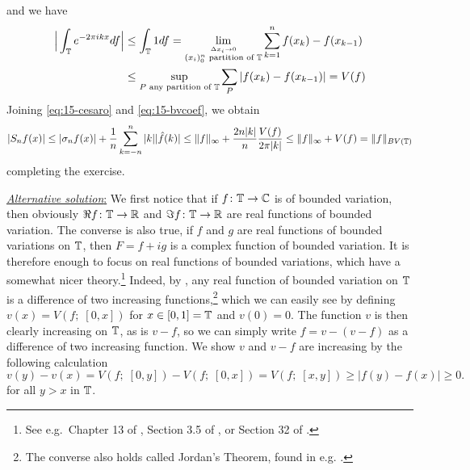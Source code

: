 \documentclass[a4paper, 12pt]{article}
\begin{document}
\begin{Exercise}
    and we have
    \begin{align*}
        \Big| \int_{\mathbb{T}} e^{-2\pi i k x} df \Big|
        &\leq \int_{\mathbb{T}} 1 df
        = \lim_{\overset{\Delta x_i \to 0}{(x_i)_0^n \text{ partition of } \mathbb{T}}} \sum_{k = 1}^{n} f(x_k) - f(x_{k-1}) \\
        &\leq \sup_{P \text{ any partition of } \mathbb{T}} \sum_{P} |f(x_k) - f(x_{k-1})|
        = V(f)
    \end{align*}
    Joining \eqref{eq:15-cesaro} and \eqref{eq:15-bvcoef}, we obtain
    \[
        |S_n f(x) |
        \leq |\sigma_n f(x)| + \frac{1}{n}\sum_{k = -n}^{n} |k| |\hat{f}(k)|
        \leq \| f\|_\infty + \frac{2n|k|}{n} \frac{V(f)}{2\pi |k|}
        \leq \| f\|_\infty + V(f)
        = \| f \|_{BV(\mathbb{T})}
    \]
    completing the exercise.

    \underline{\emph{Alternative solution}:}
    We first notice that if $f \colon \mathbb{T} \to \mathbb{C}$ is of bounded variation, then
    obviously $\Re f \colon \mathbb{T} \to \mathbb{R}$ and $\Im f \colon \mathbb{T} \to \mathbb{R}$ are real
    functions of bounded variation.  The converse is also true, if $f$ and $g$
    are real functions of bounded variations on $\mathbb{T}$, then $F = f + ig$ is a
    complex function of bounded variation. It is therefore enough to focus on
    real functions of bounded variations, which have a somewhat nicer
    theory.\footnote{See e.g.\ Chapter 13 of \cite{Carothers2000},
    Section 3.5 of \cite{Folland1999}, or Section 32 of \cite{Kolmogorov1975}.}
    Indeed, by \cite[Theorem 13.5]{Carothers2000},
    any real function of bounded variation on $\mathbb{T}$ is a difference of two
    increasing functions,\footnote{The converse also holds called Jordan's
    Theorem, found in e.g. \cite[Corollary 13.6]{Carothers2000}.} which we can
    easily see by defining $v(x) = V(f;\; [0, x])$ for $x \in [0, 1] = \mathbb{T}$ and
    $v(0) = 0$. The function $v$ is then clearly increasing on $\mathbb{T}$, as is $v -
    f$, so we can simply write $f = v - (v - f)$ as a difference of two
    increasing function.
    We show $v$ and $v-f$ are increasing by the following calculation
    \[
        v(y) - v(x)
        = V(f; \; [0,y]) - V(f;\; [0,x])
        = V(f; \; [x, y])
        \geq |f(y) - f(x)|
        \geq 0.
    \]
    for all $y > x$ in $\mathbb{T}$.


\end{Exercise}
\end{document}
